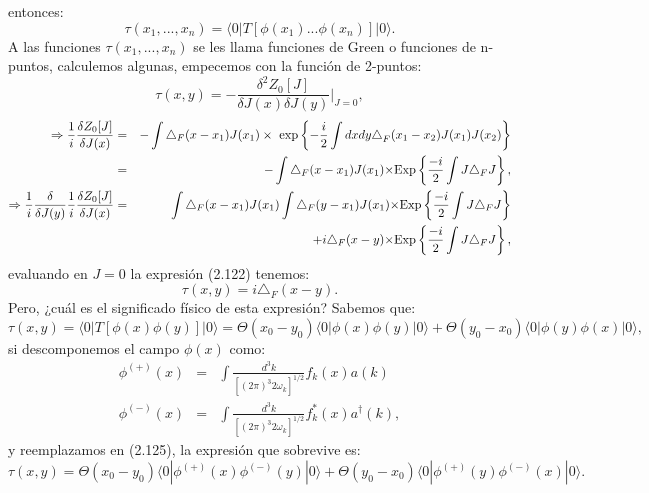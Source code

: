 entonces:
\begin{equation}
\tau(x_1,...,x_n)=\langle0|T[\phi(x_{1})...\phi(x_{n})]|0\rangle .
\end{equation}
A las funciones $\tau(x_1,...,x_n)$ se les llama funciones de Green o funciones de n-puntos, calculemos algunas, empecemos con la función de 2-puntos:
\begin{equation}
\tau(x,y)=-\frac{\delta^2Z_0[J]}{\delta J(x)\delta J(y)}\bigg|_{J=0} ,
\end{equation}
\begin{eqnarray}
\nonumber \Rightarrow \frac{1}{i}\frac{\delta Z_{0}[J]}{\delta J(x)}&=&-\int\triangle_{F}(x-x_{1})J(x_{1})\times\ \exp\left\{ -\frac{i}{2}\int dxdy\text{\ensuremath{\triangle}}_{F}(x_{1}-x_{2})J(x_{1})J(x_{2})\right\}\\
\nonumber &=& -\int\triangle_{F}(x-x_{1})J(x_{1})\text{\ensuremath{\times}Exp}\left\{ \frac{-i}{2}\int J\triangle_{F}J\right\} ,\\ 
\nonumber \Rightarrow \frac{1}{i}\frac{\delta}{\delta J(y)}\frac{1}{i}\frac{\delta Z_{0}[J]}{\delta J(x)}&=&\int\triangle_{F}(x-x_{1})J(x_{1})\int\triangle_{F}(y-x_{1})J(x_{1})\text{\ensuremath{\times}Exp}\left\{ \frac{-i}{2}\int J\triangle_{F}J\right\}\\
&&+ i\triangle_{F}(x-y)\text{\ensuremath{\times}Exp}\left\{ \frac{-i}{2}\int J\triangle_{F}J\right\} ,
\end{eqnarray}
evaluando en $J=0$ la expresión (2.122) tenemos:
\begin{equation}
\tau(x,y)=i\triangle_F(x-y) .
\end{equation}
Pero, ¿cuál es el significado físico de esta expresión? Sabemos que:
\begin{equation}
\tau(x,y)=\langle0|T[\phi(x)\phi(y)]|0\rangle=\Theta(x_{0}-y_{0})\langle0|\phi(x)\phi(y)|0\rangle+\Theta(y_{0}-x_{0})\langle0|\phi(y)\phi(x)|0\rangle ,
\end{equation}          
si descomponemos el campo $\phi(x)$ como:
\begin{eqnarray}
\phi^{(+)}(x)&=&\int\frac{d^{3}k}{[(2\pi)^{3}2\omega_{k}]^{1/2}}f_{k}(x)a(k)\\
\phi^{(-)}(x)&=&\int\frac{d^{3}k}{[(2\pi)^{3}2\omega_{k}]^{1/2}}f_{k}^*(x)a^\dagger(k),
\end{eqnarray}
y reemplazamos en (2.125), la expresión que sobrevive es:
\begin{equation}
\tau(x,y)=\Theta(x_{0}-y_{0})\langle0|\phi^{(+)}(x)\phi^{(-)}(y)|0\rangle+\Theta(y_{0}-x_{0})\langle0|\phi^{(+)}(y)\phi^{(-)}(x)|0\rangle .
\end{equation}
